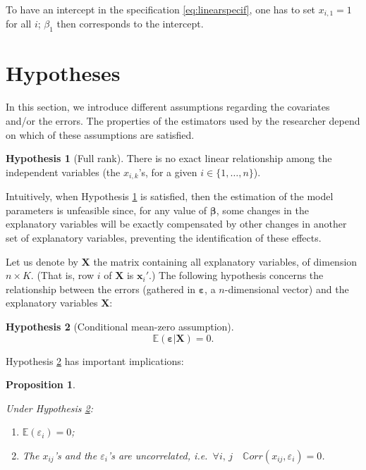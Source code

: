 \documentclass[
  12pt,
]{book}
\providecommand{\tightlist}{%
  \setlength{\itemsep}{0pt}\setlength{\parskip}{0pt}}
\newtheorem{proposition}{Proposition}[chapter]
\theoremstyle{definition}
\theoremstyle{definition}
\theoremstyle{definition}
\theoremstyle{definition}
\newtheorem{hypothesis}{Hypothesis}[chapter]
\theoremstyle{remark}
\begin{document}
To have an intercept in the specification \eqref{eq:linearspecif}, one has to set \(x_{i,1}=1\) for all \(i\); \(\beta_1\) then corresponds to the intercept.

\hypertarget{linearHyp}{%
\section{Hypotheses}\label{linearHyp}}

In this section, we introduce different assumptions regarding the covariates and/or the errors. The properties of the estimators used by the researcher depend on which of these assumptions are satisfied.

\begin{hypothesis}[Full rank]
\protect\hypertarget{hyp:fullrank}{}\label{hyp:fullrank}There is no exact linear relationship among the independent variables (the \(x_{i,k}\)'s, for a given \(i \in \{1,\dots,n\}\)).
\end{hypothesis}

Intuitively, when Hypothesis \ref{hyp:fullrank} is satisfied, then the estimation of the model parameters is unfeasible since, for any value of \(\boldsymbol\beta\), some changes in the explanatory variables will be exactly compensated by other changes in another set of explanatory variables, preventing the identification of these effects.

Let us denote by \(\mathbf{X}\) the matrix containing all explanatory variables, of dimension \(n \times K\). (That is, row \(i\) of \(\mathbf{X}\) is \(\mathbf{x}_i'\).) The following hypothesis concerns the relationship between the errors (gathered in \(\boldsymbol\varepsilon\), a \(n\)-dimensional vector) and the explanatory variables \(\mathbf{X}\):

\begin{hypothesis}[Conditional mean-zero assumption]
\protect\hypertarget{hyp:exogeneity}{}\label{hyp:exogeneity}\begin{equation}
\mathbb{E}(\boldsymbol\varepsilon|\mathbf{X}) = 0.
\end{equation}
\end{hypothesis}

Hypothesis \ref{hyp:exogeneity} has important implications:

\begin{proposition}
\protect\hypertarget{prp:implicationExog}{}\label{prp:implicationExog}

Under Hypothesis \ref{hyp:exogeneity}:

\begin{enumerate}
\def\labelenumi{\roman{enumi}.}
\tightlist
\item
  \(\mathbb{E}(\varepsilon_{i})=0\);
\item
  The \(x_{ij}\)'s and the \(\varepsilon_{i}\)'s are uncorrelated, i.e.~\(\forall i,\,j \quad \mathbb{C}orr(x_{ij},\varepsilon_{i})=0\).
\end{enumerate}

\end{proposition}
\end{document}
